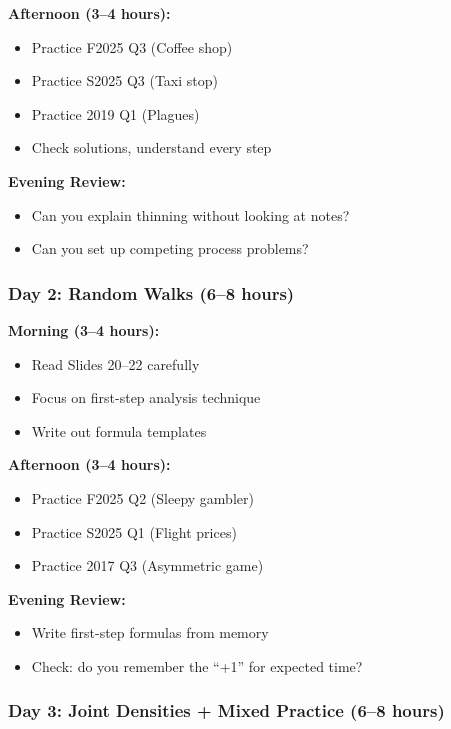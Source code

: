 \documentclass[11pt,letterpaper]{article}
\begin{document}
\textbf{Afternoon (3--4 hours):}
\begin{itemize}[leftmargin=*]
  \item Practice F2025 Q3 (Coffee shop)
  \item Practice S2025 Q3 (Taxi stop)
  \item Practice 2019 Q1 (Plagues)
  \item Check solutions, understand every step
\end{itemize}

\textbf{Evening Review:}
\begin{itemize}[leftmargin=*]
  \item Can you explain thinning without looking at notes?
  \item Can you set up competing process problems?
\end{itemize}

\subsubsection{Day 2: Random Walks (6--8 hours)}

\textbf{Morning (3--4 hours):}
\begin{itemize}[leftmargin=*]
  \item Read Slides 20--22 carefully
  \item Focus on first-step analysis technique
  \item Write out formula templates
\end{itemize}

\textbf{Afternoon (3--4 hours):}
\begin{itemize}[leftmargin=*]
  \item Practice F2025 Q2 (Sleepy gambler)
  \item Practice S2025 Q1 (Flight prices)
  \item Practice 2017 Q3 (Asymmetric game)
\end{itemize}

\textbf{Evening Review:}
\begin{itemize}[leftmargin=*]
  \item Write first-step formulas from memory
  \item Check: do you remember the ``+1'' for expected time?
\end{itemize}

\subsubsection{Day 3: Joint Densities + Mixed Practice (6--8 hours)}
\end{document}
